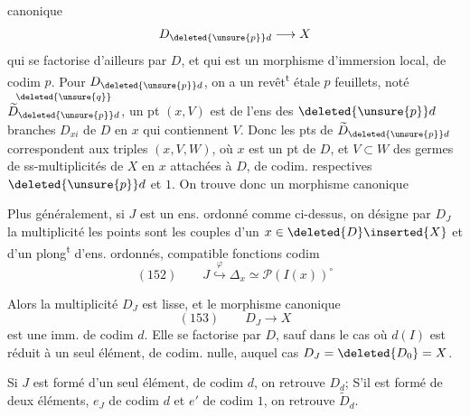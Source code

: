 
canonique
\[
D_{\deleted{\unsure{p}}d}\longrightarrow X
\]
qui se factorise d'ailleurs par $D$, et qui est un morphisme d'immersion local, de codim $p$. Pour $D_{\deleted{\unsure{p}}d}$, on a un revêt\textsuperscript{t} étale  $p$ feuillets, noté $\overset{\deleted{\unsure{q}}}{\widetilde D_{\deleted{\unsure{p}}d}}$,  un pt $(x,V)$ est  de l'ens des $\deleted{\unsure{p}}d$ branches $D_{xi}$ de $D$ en $x$ qui contiennent $V$. Donc les  pts de $\widetilde D_{\deleted{\unsure{p}}d}$ correspondent aux triples $(x,V,W)$, où $x$ est un pt de $D$, et $V\subset W$ des germes de ss-multiplicités de $X$ en $x$ attachées à $D$, de codim. respectives $\deleted{\unsure{p}}d$ et $1$. On trouve donc un morphisme canonique

Plus généralement, si $J$ est un ens.  ordonné comme ci-dessus,  on  désigne par $D_J$ la  multiplicité  les points sont les couples d'un $x\in\deleted{D}\inserted{X}$  et d'un plong\textsuperscript{t} d'ens. ordonnés, compatible  fonctions codim
\[
(152)\qquad J\mathrel{\overset{\varphi}{\hookrightarrow}}\Delta_x\simeq\mathcal P(I(x))^\circ
\]


Alors la multiplicité $D_J$ est lisse,  et le morphisme canonique
\[
(153)\qquad D_J\longrightarrow X
\]
est une imm.  de codim $d$.
Elle se factorise par $D$, sauf dans le cas où $d(I)$ est réduit à un seul élément, de codim. nulle, auquel cas $D_J=\deleted{D_0}=X$.

Si $J$ est formé d'un seul élément, de codim $d$, on retrouve $D_d$; S'il est formé de deux éléments,  $e_J$ de codim $d$ et $e'$ de codim $1$, on retrouve $\widetilde D_d$.

